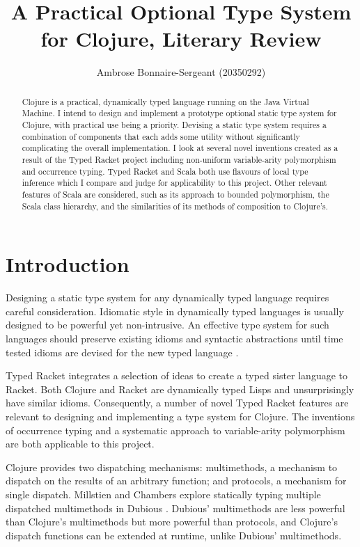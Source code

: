 \documentclass[12pt, a4paper]{article}
\title{A Practical Optional Type System for Clojure, Literary Review}
\author{Ambrose Bonnaire-Sergeant (20350292)}
\begin{document}
\maketitle

\begin{abstract}
Clojure is a practical, dynamically typed language running on the Java Virtual Machine.
I intend to design and implement a prototype optional static type 
system for Clojure, with practical use being a priority. Devising a static type system 
requires a combination of components that each adds some utility
without significantly complicating the overall implementation.
I look at several novel inventions created as a result 
of the Typed Racket project including
non-uniform variable-arity polymorphism and occurrence typing.
Typed Racket and Scala both use flavours of local type inference
which I compare and judge for applicability to this project.
Other relevant features of Scala are considered, such as its approach to bounded polymorphism,
the Scala class hierarchy, and the similarities of its methods of composition to Clojure's.
\end{abstract}

\tableofcontents

\section{Introduction}

Designing a static type system for any dynamically typed language requires
careful consideration. Idiomatic style in dynamically typed languages is usually
designed to be powerful yet non-intrusive. An effective type system
for such languages should preserve existing idioms and syntactic abstractions
until time tested idioms are devised for the new typed language \cite{SAMTH:dissertation}.

Typed Racket \cite{SAMTH:dissertation} integrates a selection of ideas to
create a typed sister language to Racket.
Both Clojure and Racket are dynamically typed Lisps and unsurprisingly have similar idioms. 
Consequently, a number of novel Typed Racket features are relevant to designing and implementing 
a type system for Clojure.
The inventions of occurrence typing \cite{Tobin-Hochstadt:2010:LTU:1932681.1863561}
and a systematic approach to variable-arity polymorphism
\cite{Strickland:2009:PVP:1532974.1532978}
are both applicable to this project.

Clojure provides two dispatching mechanisms: multimethods, a mechanism to dispatch on the
results of an arbitrary function; and protocols, a mechanism for single dispatch.
Millstien and Chambers explore statically typing multiple dispatched multimethods in Dubious \cite{Millstein02modularstatically}.
Dubious' multimethods are less powerful than Clojure's multimethods but more powerful than protocols,
and Clojure's dispatch functions can be extended at runtime, unlike Dubious' multimethods.
\end{document}
